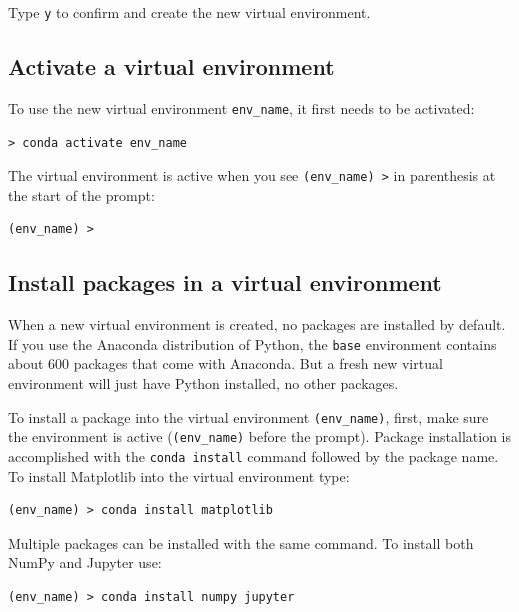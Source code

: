 \documentclass{book}
\begin{document}
Type \lstinline!y! to confirm and create the new virtual environment.
    




    
        \subsection{Activate a virtual
environment}\label{activate-a-virtual-environment}

To use the new virtual environment \lstinline!env_name!, it first needs
to be activated:

\begin{lstlisting}
> conda activate env_name
\end{lstlisting}

The virtual environment is active when you see \lstinline!(env_name) >!
in parenthesis at the start of the prompt:

\begin{lstlisting}
(env_name) > 
\end{lstlisting}
    




    
        \subsection{Install packages in a virtual
environment}\label{install-packages-in-a-virtual-environment}

When a new virtual environment is created, no packages are installed by
default. If you use the Anaconda distribution of Python, the
\lstinline!base! environment contains about 600 packages that come with
Anaconda. But a fresh new virtual environment will just have Python
installed, no other packages.

To install a package into the virtual environment
\lstinline!(env_name)!, first, make sure the environment is active
(\lstinline!(env_name)! before the prompt). Package installation is
accomplished with the \lstinline!conda install! command followed by the
package name. To install Matplotlib into the virtual environment type:

\begin{lstlisting}
(env_name) > conda install matplotlib
\end{lstlisting}

Multiple packages can be installed with the same command. To install
both NumPy and Jupyter use:

\begin{lstlisting}
(env_name) > conda install numpy jupyter
\end{lstlisting}
    
\end{document}
